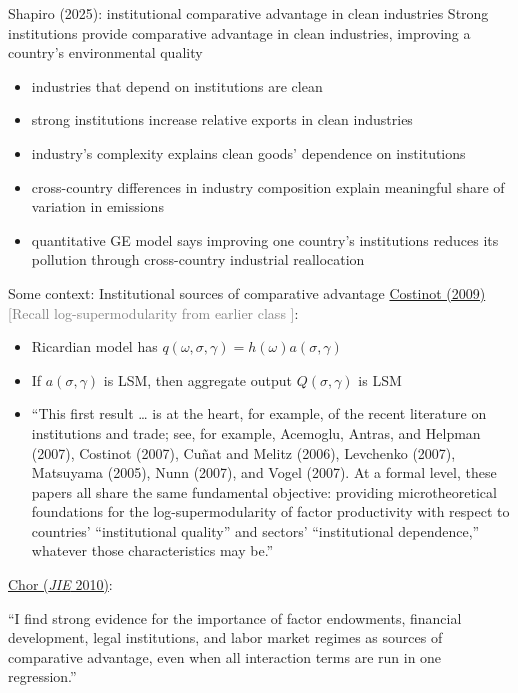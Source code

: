 \documentclass[11pt,notes=hide,aspectratio=169]{beamer}
\begin{document}
\begin{frame}{Shapiro (2025): institutional comparative advantage in clean industries}
Strong institutions provide comparative advantage in clean industries, improving a country's environmental quality
\begin{itemize}
\item industries that depend on institutions are clean
\item strong institutions increase relative exports in clean industries
\item industry's complexity explains clean goods' dependence on institutions
\item cross-country differences in industry composition explain meaningful share of variation in emissions
\item quantitative GE model says improving one country's  institutions reduces its pollution through cross-country industrial reallocation
\end{itemize}
\end{frame}
\begin{frame}{Some context: Institutional sources of comparative advantage}
\hypertarget{institutionalsourcesofCA}{}
\href{http://dx.doi.org/10.3982/ECTA7636}{Costinot (2009)} \textcolor{gray}{[Recall log-supermodularity from earlier class \hyperlink{appendix:LSM}{}]}:
\begin{itemize}
\item Ricardian model has $q(\omega,\sigma,\gamma) = h(\omega) a(\sigma,\gamma)$ 
\item If $a(\sigma,\gamma)$ is LSM, then aggregate output $Q(\sigma,\gamma)$ is LSM
\item {\footnotesize
``This first result %
\dots
is at the heart, for example, of the recent literature on institutions and trade; see, for example, Acemoglu, Antras, and Helpman (2007), Costinot (2007), Cuñat and Melitz (2006), Levchenko (2007), Matsuyama (2005), Nunn (2007), and Vogel (2007). At a formal level, these papers all share the same fundamental objective: providing microtheoretical foundations for the log-supermodularity of factor productivity with respect to countries’ ``institutional quality'' and sectors’ ``institutional dependence,'' whatever those characteristics may be.''\par}
\end{itemize}
\href{http://dx.doi.org/10.1016/j.jinteco.2010.07.004}{Chor (\textit{JIE} 2010)}:
{\small ``I find strong evidence for the importance of factor endowments, financial development, legal institutions, and labor market regimes as sources of comparative advantage, even when all interaction terms are run in one regression.''\par}
\end{frame}
\end{document}
